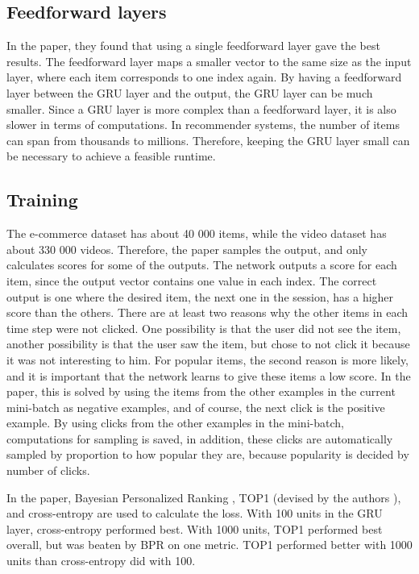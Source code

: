 \subsection{Feedforward layers}
In the paper, they found that using a single feedforward layer gave the best results. The feedforward layer maps a smaller vector to the same size as the input layer, where each item corresponds to one index again. By having a feedforward layer between the GRU layer and the output, the GRU layer can be much smaller. Since a GRU layer is more complex than a feedforward layer, it is also slower in terms of computations. In recommender systems, the number of items can span from thousands to millions. Therefore, keeping the GRU layer small can be necessary to achieve a feasible runtime.

\subsection{Training}
The e-commerce dataset has about 40 000 items, while the video dataset has about 330 000 videos. Therefore, the paper samples the output, and only calculates scores for some of the outputs. The network outputs a score for each item, since the output vector contains one value in each index. The correct output is one where the desired item, the next one in the session, has a higher score than the others. There are at least two reasons why the other items in each time step were not clicked. One possibility is that the user did not see the item, another possibility is that the user saw the item, but chose to not click it because it was not interesting to him. For popular items, the second reason is more likely, and it is important that the network learns to give these items a low score. In the paper, this is solved by using the items from the other examples in the current mini-batch as negative examples, and of course, the next click is the positive example. By using clicks from the other examples in the mini-batch, computations for sampling is saved, in addition, these clicks are automatically sampled by proportion to how popular they are, because popularity is decided by number of clicks.

In the paper, Bayesian Personalized Ranking \cite{Rendle:2009:BBP:1795114.1795167}, TOP1 (devised by the authors \cite{DBLP:journals/corr/HidasiKBT15}), and cross-entropy are used to calculate the loss. With 100 units in the GRU layer, cross-entropy performed best. With 1000 units, TOP1 performed best overall, but was beaten by BPR on one metric. TOP1 performed better with 1000 units than cross-entropy did with 100.

